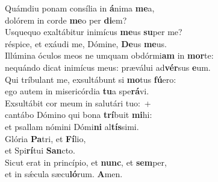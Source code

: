 \evenverse Quámdiu ponam consília in \textbf{á}nima \textbf{me}a,~\*\\
\evenverse dolórem in corde \textbf{me}o per \textbf{di}em?\\
\oddverse Usquequo exaltábitur inimícus \textbf{me}us \textbf{su}per me?~\*\\
\oddverse réspice, et exáudi me, Dómine, \textbf{De}us \textbf{me}us.\\
\evenverse Illúmina óculos meos ne umquam obdórmi\textbf{am} in \textbf{mor}te:~\*\\
\evenverse nequándo dicat inimícus meus: præválui ad\textbf{vér}sus \textbf{e}um.\\
\oddverse Qui tríbulant me, exsultábunt si \textbf{mo}tus \textbf{fú}ero:~\*\\
\oddverse ego autem in misericórdia \textbf{tu}a spe\textbf{rá}vi.\\
\evenverse Exsultábit cor meum in salutári tuo:~+\\
\evenverse  cantábo Dómino qui bona \textbf{trí}buit \textbf{mi}hi:~\*\\
\evenverse et psallam nómini Dómi\textbf{ni} al\textbf{tís}simi.\\
\oddverse Glória \textbf{Pa}tri, et \textbf{Fí}lio,~\*\\
\oddverse et Spi\textbf{rí}tui \textbf{San}cto.\\
\evenverse Sicut erat in princípio, et \textbf{nunc}, et \textbf{sem}per,~\*\\
\evenverse et in sǽcula sæcu\textbf{ló}rum. \textbf{A}men.\\
